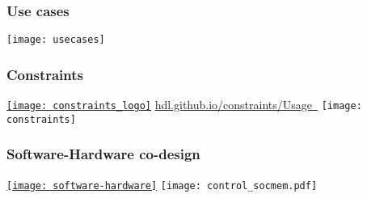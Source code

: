 \documentclass[xcolor={usenames,dvipsnames}]{beamer}
\begin{document}
\begin{frame}
\frametitle{Use cases}
\centering
\texttt{[image: usecases]}
\end{frame}

\begin{frame}
  \frametitle{Constraints}
  \centering
  \href{https://hdl.github.io/constraints/Usage.html}{\texttt{[image: constraints\_logo]}}
  \vfill
  \Large\href{https://hdl.github.io/constraints/Usage.html}{hdl.github.io/constraints/Usage~\faBook}
  \vfill
  \texttt{[image: constraints]}
\end{frame}

\begin{frame}
  \frametitle{Software-Hardware co-design}
  \centering
  \href{https://umarcor.github.io/SIEAV/Co-design.html}{\texttt{[image: software-hardware]}}
  \vfill
  \texttt{[image: control\_socmem.pdf]}
\end{frame}
\end{document}
